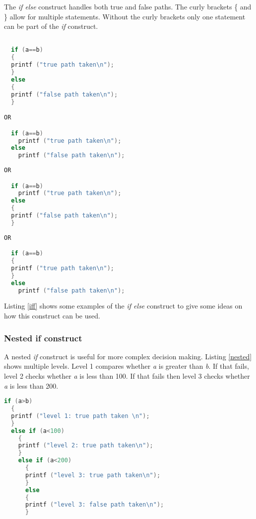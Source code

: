 
The \textit{if else} construct handles both true and false paths. The curly brackets \{ and \} allow for multiple statements. Without the curly brackets only one statement can be part of the \textit{if} construct.

\begin{lstlisting}[language=C,showstringspaces=false,caption={Syntax if (a==b) else construct},captionpos=b,label=iff]

  if (a==b)
  {
  printf ("true path taken\n");
  }
  else
  {
  printf ("false path taken\n");
  }

OR

  if (a==b)
    printf ("true path taken\n");
  else
    printf ("false path taken\n");
      
OR

  if (a==b)
    printf ("true path taken\n");
  else
  {
  printf ("false path taken\n");
  }  
  
OR

  if (a==b)
  {
  printf ("true path taken\n");
  }
  else
    printf ("false path taken\n");

\end{lstlisting}

Listing \ref{iff} shows some examples of the \textit{if else} construct to give some ideas on how this construct can be used. 

\subsubsection{Nested if construct}

A nested \textit{if} construct is useful for more complex decision making. Listing \ref{nested} shows multiple levels. Level 1 compares whether \textit{a} is greater than \textit{b}. If that fails, level 2 checks whether \textit{a} is less than 100. If that fails then level 3 checks whether \textit{a} is less than 200.\\ 
 
\begin{lstlisting}[language=C,showstringspaces=false,caption={Example nested if's},captionpos=b,label=nested]
  if (a>b)
  {
  printf ("level 1: true path taken \n");
  }
  else if (a<100)
    {
    printf ("level 2: true path taken\n");
    }
    else if (a<200)
      {
      printf ("level 3: true path taken\n");
      }
      else
      {
      printf ("level 3: false path taken\n");
      } 

\end{lstlisting}

